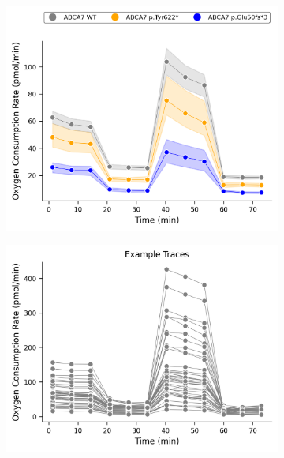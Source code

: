 \begin{figure}[H]
    \begin{subfigure}[t]{0.33\textwidth}
        \caption{}
        \includegraphics[width=\textwidth]{../paper/extended_plots/rep_seahorse_curves_by_line.png}        
    \end{subfigure}
    \begin{subfigure}[t]{0.33\textwidth}
        \caption{}
        \includegraphics[width=\textwidth]{../paper/extended_plots/rep_seahorse_curves_all.png}        
    \end{subfigure}   
    \begin{subfigure}[t]{0.33\textwidth}

\end{subfigure}
\end{figure}
